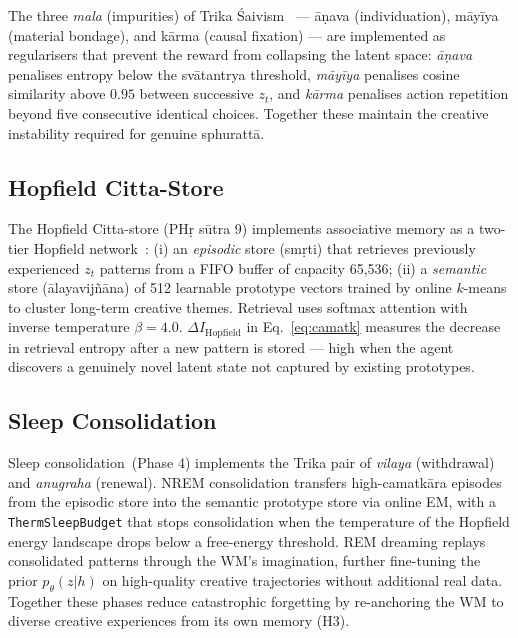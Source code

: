 \documentclass[journal,onecolumn,11pt]{IEEEtran}
\begin{document}
The three \emph{mala} (impurities) of Trika
Śaivism~\cite{abhinavagupta2012tantraloka,wallis2012tantra} ---
āṇava (individuation), māyīya (material bondage), and kārma (causal
fixation) --- are implemented as regularisers that prevent the reward from
collapsing the latent space: \emph{āṇava} penalises entropy below the
svātantrya threshold, \emph{māyīya} penalises cosine similarity above $0.95$
between successive $z_t$, and \emph{kārma} penalises action repetition
beyond five consecutive identical choices.
Together these maintain the creative instability required for genuine
sphurattā.

\subsection{Hopfield Citta-Store}

The Hopfield Citta-store (PHṛ sūtra 9) implements associative memory as a
two-tier Hopfield network~\cite{ramsauer2020hopfield}:
(i) an \emph{episodic} store (smṛti) that retrieves previously experienced
$z_t$ patterns from a FIFO buffer of capacity 65,536;
(ii) a \emph{semantic} store (ālayavijñāna) of 512 learnable prototype vectors
trained by online $k$-means to cluster long-term creative themes.
Retrieval uses softmax attention with inverse temperature $\beta = 4.0$.
$\Delta I_{\text{Hopfield}}$ in Eq.~\eqref{eq:camatk} measures the decrease
in retrieval entropy after a new pattern is stored — high when the agent
discovers a genuinely novel latent state not captured by existing prototypes.

\subsection{Sleep Consolidation}

Sleep consolidation~(Phase 4) implements the Trika pair of \emph{vilaya}
(withdrawal) and \emph{anugraha} (renewal).
NREM consolidation transfers high-camatkāra episodes from the episodic store
into the semantic prototype store via online EM, with a
\texttt{ThermSleepBudget} that stops consolidation when the temperature
of the Hopfield energy landscape drops below a free-energy threshold.
REM dreaming replays consolidated patterns through the WM's imagination,
further fine-tuning the prior $p_\theta(z|h)$ on high-quality creative
trajectories without additional real data.
Together these phases reduce catastrophic forgetting by re-anchoring the WM
to diverse creative experiences from its own memory (H3).
\end{document}
